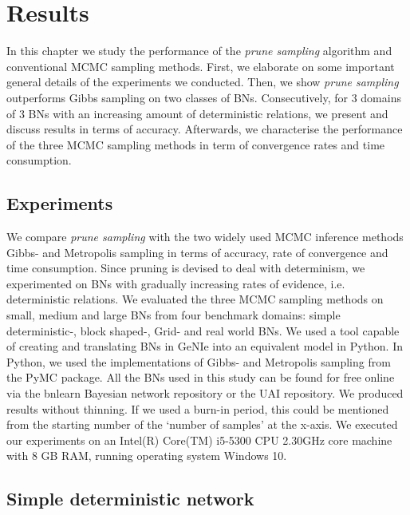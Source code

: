 \documentclass[a4paper, twoside, 11pt]{report}
\theoremstyle{plain}
\theoremstyle{definition}
\theoremstyle{remark}
\newcommand{\ps}{\textit{prune sampling }}
\begin{document}


\chapter{Results}
In this chapter we study the performance of the \ps algorithm and conventional MCMC sampling methods. First, we elaborate on some important general details of the experiments we conducted. Then, we show \ps outperforms Gibbs sampling on two classes of BNs. Consecutively, for 3 domains of 3 BNs with an increasing amount of deterministic relations, we present and discuss results in terms of accuracy. Afterwards, we characterise the performance of the three MCMC sampling methods in term of convergence rates and time consumption.

\section{Experiments}
We compare \ps with the two widely used MCMC inference methods Gibbs- and Metropolis sampling in terms of accuracy, rate of convergence and time consumption. Since pruning is devised to deal with determinism, we experimented on BNs with gradually increasing rates of evidence, i.e. deterministic relations. We evaluated the three MCMC sampling methods on small, medium and large BNs from four benchmark domains: simple deterministic-, block shaped-, Grid- and real world BNs. We used a tool capable of creating and translating BNs in GeNIe into an equivalent model in Python. In Python, we used the implementations of Gibbs- and Metropolis sampling from the PyMC package. All the BNs used in this study can be found for free online via the bnlearn Bayesian network repository or the UAI repository. We produced results without thinning. If we used a burn-in period, this could be mentioned from the starting number of the `number of samples' at the x-axis. We executed our experiments on an Intel(R) Core(TM) i5-5300 CPU 2.30GHz core machine with 8 GB RAM, running operating system Windows 10.

\section{Simple deterministic network}
\end{document}
